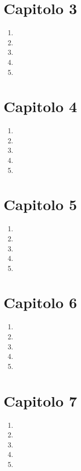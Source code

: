 \documentclass[ paper=a4
              , pagesize
              , fontsize=12pt
              , twoside=true
              , BCOR=5mm
              , DIV=calc
              , bibliography=totoc
              , final
              , version=last
              ]{scrbook}
\begin{document}
\section*{Capitolo 3}
\begin{enumerate}
    \item
    \item     
    \item     
    \item     
    \item 
\end{enumerate}
\section*{Capitolo 4}
\begin{enumerate}
    \item
    \item     
    \item     
    \item     
    \item 
\end{enumerate}
\section*{Capitolo 5}
\begin{enumerate}
    \item
    \item     
    \item     
    \item     
    \item 
\end{enumerate}
\section*{Capitolo 6}
\begin{enumerate}
    \item
    \item     
    \item     
    \item     
    \item 
\end{enumerate}
\section*{Capitolo 7}
\begin{enumerate}
    \item
    \item     
    \item     
    \item     
    \item 
\end{enumerate}
\end{document}
